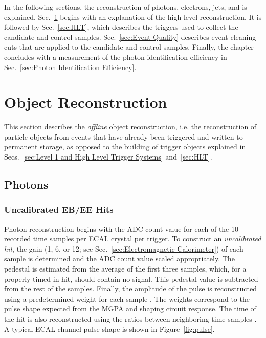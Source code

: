 \documentclass[dissertation.tex]{subfiles}
\begin{document}
In the following sections, the reconstruction of photons, electrons, jets, and \MET is explained.  Sec.~\ref{sec:Object Reconstruction} begins with an explanation of the high level reconstruction.  It is followed by Sec.~\ref{sec:HLT}, which describes the triggers used to collect the candidate and control samples.  Sec.~\ref{sec:Event Quality} describes event cleaning cuts that are applied to the candidate and control samples.  Finally, the chapter concludes with a measurement of the photon identification efficiency in Sec.~\ref{sec:Photon Identification Efficiency}.

\section{Object Reconstruction}
\label{sec:Object Reconstruction}

This section describes the \textit{offline} object reconstruction, i.e. the reconstruction of particle objects from events that have already been triggered and written to permanent storage, as opposed to the building of trigger objects explained in Secs.~\ref{sec:Level 1 and High Level Trigger Systems} and~\ref{sec:HLT}.

\subsection{Photons}
\label{sec:Photons}

\subsubsection{Uncalibrated EB/EE Hits}
\label{sec:Uncalibrated EB/EE Hits}

Photon reconstruction begins with the ADC count value for each of the 10 recorded time samples per ECAL crystal per trigger.  To construct an \textit{uncalibrated hit}, the gain (1, 6, or 12; see Sec.~\ref{sec:Electromagnetic Calorimeter}) of each sample is determined and the ADC count value scaled appropriately.  The pedestal is estimated from the average of the first three samples, which, for a properly timed in hit, should contain no signal.  This pedestal value is subtracted from the rest of the samples.  Finally, the amplitude of the pulse is reconstructed using a predetermined weight for each sample \cite{Bruneliere200733}.  The weights correspond to the pulse shape expected from the MGPA and shaping circuit response.  The time of the hit is also reconstructed using the ratios between neighboring time samples \cite{1748-0221-5-03-T03011}.  A typical ECAL channel pulse shape is shown in Figure~\ref{fig:pulse}.
\end{document}
